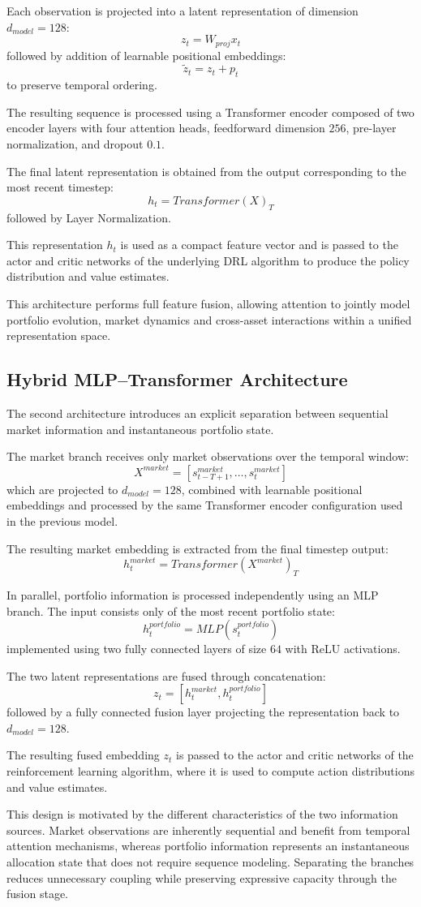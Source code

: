 Each observation is projected into a latent representation of dimension
$d_{model}=128$:
\[
z_t = W_{proj}x_t
\]
followed by addition of learnable positional embeddings:
\[
\tilde{z}_t = z_t + p_t
\]
to preserve temporal ordering.

The resulting sequence is processed using a Transformer encoder composed of two encoder
layers with four attention heads, feedforward dimension $256$, pre-layer normalization,
and dropout $0.1$.

The final latent representation is obtained from the output corresponding to the most
recent timestep:
\[
h_t = Transformer(X)_T
\]
followed by Layer Normalization.

This representation $h_t$ is used as a compact feature vector and is passed to the
actor and critic networks of the underlying DRL algorithm to produce the policy
distribution and value estimates.

This architecture performs full feature fusion, allowing attention to jointly model
portfolio evolution, market dynamics and cross-asset interactions within a unified
representation space.

\subsection{Hybrid MLP--Transformer Architecture}

The second architecture introduces an explicit separation between sequential market
information and instantaneous portfolio state.

The market branch receives only market observations over the temporal window:
\[
X^{market}
=
[s_{t-T+1}^{market}, \dots, s_t^{market}]
\]
which are projected to $d_{model}=128$, combined with learnable positional embeddings
and processed by the same Transformer encoder configuration used in the previous model.

The resulting market embedding is extracted from the final timestep output:
\[
h_t^{market}
=
Transformer(X^{market})_T
\]

In parallel, portfolio information is processed independently using an MLP branch.
The input consists only of the most recent portfolio state:
\[
h_t^{portfolio}
=
MLP(s_t^{portfolio})
\]
implemented using two fully connected layers of size $64$ with ReLU activations.

The two latent representations are fused through concatenation:
\[
z_t
=
[h_t^{market}, h_t^{portfolio}]
\]
followed by a fully connected fusion layer projecting the representation back to
$d_{model}=128$.

The resulting fused embedding $z_t$ is passed to the actor and critic networks of the
reinforcement learning algorithm, where it is used to compute action distributions and
value estimates.

This design is motivated by the different characteristics of the two information sources.
Market observations are inherently sequential and benefit from temporal attention
mechanisms, whereas portfolio information represents an instantaneous allocation state
that does not require sequence modeling. Separating the branches reduces unnecessary
coupling while preserving expressive capacity through the fusion stage.